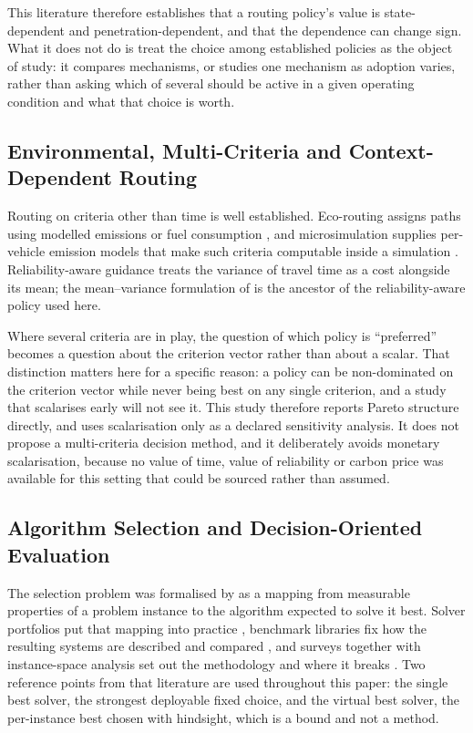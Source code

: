 \documentclass[preprint,12pt]{elsarticle}
\begin{document}
This literature therefore establishes that a routing policy's value is
state-dependent and penetration-dependent, and that the dependence can change
sign. What it does not do is treat the choice among established policies as the
object of study: it compares mechanisms, or studies one mechanism as adoption
varies, rather than asking which of several should be active in a given
operating condition and what that choice is worth.

\subsection{Environmental, Multi-Criteria and Context-Dependent Routing}
\label{sec:lit:multi}

Routing on criteria other than time is well established. Eco-routing assigns
paths using modelled emissions or fuel consumption
\citep{boriboonsomsin2012eco}, and microsimulation supplies per-vehicle emission
models that make such criteria computable inside a simulation
\citep{krajzewicz2015emissions}. Reliability-aware guidance treats the variance
of travel time as a cost alongside its mean; the mean--variance formulation of
\citet{sen2001meanvariance} is the ancestor of the reliability-aware policy used
here.

Where several criteria are in play, the question of which policy is
``preferred'' becomes a question about the criterion vector rather than about a
scalar. That distinction matters here for a specific reason: a policy can be
non-dominated on the criterion vector while never being best on any single
criterion, and a study that scalarises early will not see it. This study
therefore reports Pareto structure directly, and uses scalarisation only as a
declared sensitivity analysis. It does not propose a multi-criteria decision
method, and it deliberately avoids monetary scalarisation, because no value of
time, value of reliability or carbon price was available for this setting that
could be sourced rather than assumed.

\subsection{Algorithm Selection and Decision-Oriented Evaluation}
\label{sec:lit:as}

The selection problem was formalised by \citet{rice1976} as a mapping from
measurable properties of a problem instance to the algorithm expected to solve
it best. Solver portfolios put that mapping into practice
\citep{xu2008satzilla}, benchmark libraries fix how the resulting systems are
described and compared \citep{bischl2016aslib}, and surveys together with
instance-space analysis set out the methodology and where it breaks
\citep{kotthoff2014survey,smithmiles2009,smithmiles2014instance}. Two reference
points from that literature are used throughout this paper: the single best
solver, the strongest deployable fixed choice, and the virtual best solver, the
per-instance best chosen with hindsight, which is a bound and not a method.
\end{document}
